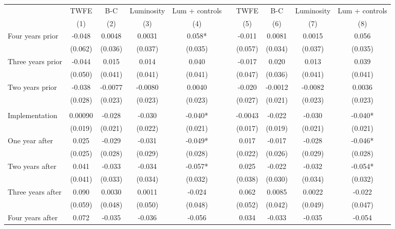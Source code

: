 \begin{tabular}{lccccccccc}
\toprule
      & TWFE  & B-C   & Luminosity & Lum + controls &       & TWFE  & B-C   & Luminosity & Lum + controls \\
\cmidrule{2-5}\cmidrule{7-10}      & (1)   & (2)   & (3)   & (4)   &       & (5)   & (6)   & (7)   & (8) \\
\midrule
\midrule
Four years prior & -0.048 & 0.0048 & 0.0031 & 0.058* &       & -0.011 & 0.0081 & 0.0015 & 0.056 \\
      & (0.062) & (0.036) & (0.037) & (0.035) &       & (0.057) & (0.034) & (0.037) & (0.035) \\
Three years prior & -0.044 & 0.015 & 0.014 & 0.040 &       & -0.017 & 0.020 & 0.013 & 0.039 \\
      & (0.050) & (0.041) & (0.041) & (0.041) &       & (0.047) & (0.036) & (0.041) & (0.041) \\
Two years prior & -0.038 & -0.0077 & -0.0080 & 0.0040 &       & -0.020 & -0.0012 & -0.0082 & 0.0036 \\
      & (0.028) & (0.023) & (0.023) & (0.023) &       & (0.027) & (0.021) & (0.023) & (0.023) \\
      &       &       &       &       &       &       &       &       &  \\
Implementation & 0.00090 & -0.028 & -0.030 & -0.040* &       & -0.0043 & -0.022 & -0.030 & -0.040* \\
      & (0.019) & (0.021) & (0.022) & (0.021) &       & (0.017) & (0.019) & (0.021) & (0.021) \\
One year after & 0.025 & -0.029 & -0.031 & -0.049* &       & 0.017 & -0.017 & -0.028 & -0.046* \\
      & (0.025) & (0.028) & (0.029) & (0.028) &       & (0.022) & (0.026) & (0.029) & (0.028) \\
Two years after & 0.041 & -0.033 & -0.034 & -0.057* &       & 0.025 & -0.022 & -0.032 & -0.054* \\
      & (0.041) & (0.033) & (0.034) & (0.032) &       & (0.038) & (0.030) & (0.034) & (0.032) \\
Three years after & 0.090 & 0.0030 & 0.0011 & -0.024 &       & 0.062 & 0.0085 & 0.0022 & -0.022 \\
      & (0.059) & (0.048) & (0.050) & (0.048) &       & (0.052) & (0.042) & (0.049) & (0.047) \\
Four years after & 0.072 & -0.035 & -0.036 & -0.056 &       & 0.034 & -0.033 & -0.035 & -0.054 \\

\end{tabular}

